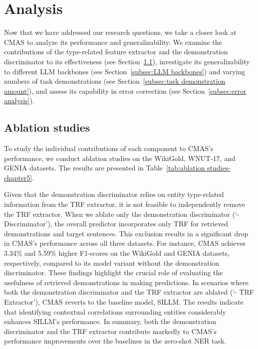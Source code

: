  \section{Analysis}
 \label{sec:analysis-chapter5}
Now that we have addressed our research questions, we take a closer look at \ac{CMAS} to analyze its performance and generalizability. We examine the contributions of the type-related feature extractor and the demonstration discriminator to its effectiveness (see Section~\ref{subsec:ablation studies}), investigate its generalizability to different \ac{LLM} backbones (see Section~\ref{subsec:LLM backbones}) and varying numbers of task demonstrations (see Section~\ref{subsec:task demonstration amount}), and assess its capability in error correction (see Section~\ref{subsec:error analysis}).

\subsection{Ablation studies}
\label{subsec:ablation studies}
To study the individual contributions of each component to \ac{CMAS}'s performance, we conduct ablation studies on the WikiGold, WNUT-17, and GENIA datasets. The results are presented in Table~\ref{tab:ablation studies-chapter5}. 

Given that the demonstration discriminator relies on entity type-related information from the \ac{TRF} extractor, it is not feasible to independently remove the \ac{TRF} extractor. When we ablate only the demonstration discriminator (`- Discriminator'), the overall predictor incorporates only \ac{TRF} for retrieved demonstrations and target sentences. This exclusion results in a significant drop in \ac{CMAS}'s performance across all three datasets. For instance, \ac{CMAS} achieves 3.34\% and 5.59\% higher F1-scores on the WikiGold and GENIA datasets, respectively, compared to its model variant without the demonstration discriminator. These findings highlight the crucial role of evaluating the usefulness of retrieved demonstrations in making predictions. In scenarios where both the demonstration discriminator and the \ac{TRF} extractor are ablated (`- TRF Extractor'), \ac{CMAS} reverts to the baseline model, SILLM. The results indicate that identifying contextual correlations surrounding entities considerably enhances SILLM's performance. 
In summary, both the demonstration discriminator and the \ac{TRF} extractor contribute markedly to \ac{CMAS}'s performance improvements over the baselines in the zero-shot \ac{NER} task.

